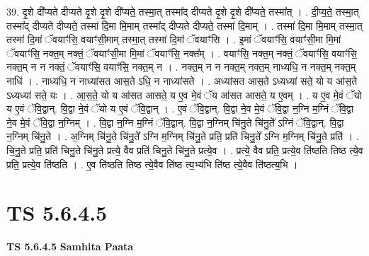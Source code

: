\documentclass[17pt]{extarticle}
\begin{document}
39. दृ॒शे दी᳚प्यते दीप्यते दृ॒शे दृ॒शे दी᳚प्यते॒ तस्मा॒त् तस्मा᳚द् दीप्यते दृ॒शे दृ॒शे दी᳚प्यते॒ तस्मा᳚त् । . दी॒प्य॒ते॒ तस्मा॒त् तस्मा᳚द् दीप्यते दीप्यते॒ तस्मा॑ दि॒मा मि॒माम् तस्मा᳚द् दीप्यते दीप्यते॒ तस्मा॑ दि॒माम् । . तस्मा॑ दि॒मा मि॒माम् तस्मा॒त् तस्मा॑ दि॒मां ॅवयाꣳ॑सि॒ वयाꣳ॑सी॒माम् तस्मा॒त् तस्मा॑ दि॒मां ॅवयाꣳ॑सि । . इ॒मां ॅवयाꣳ॑सि॒ वयाꣳ॑सी॒मा मि॒मां ॅवयाꣳ॑सि॒ नक्त॒म् नक्तं॒ ॅवयाꣳ॑सी॒मा मि॒मां ॅवयाꣳ॑सि॒ नक्त᳚म् । . वयाꣳ॑सि॒ नक्त॒म् नक्तं॒ ॅवयाꣳ॑सि॒ वयाꣳ॑सि॒ नक्त॒म् न न नक्तं॒ ॅवयाꣳ॑सि॒ वयाꣳ॑सि॒ नक्त॒म् न । . नक्त॒म् न न नक्त॒म् नक्त॒म् नाध्यधि॒ न नक्त॒म् नक्त॒म् नाधि॑ । . नाध्यधि॒ न नाध्या॑सत आस॒ते ऽधि॒ न नाध्या॑सते । . अध्या॑सत आस॒ते ऽध्यध्या॑ सते॒ यो य आ॑स॒ते ऽध्यध्या॑ सते॒ यः । . आ॒स॒ते॒ यो य आ॑सत आसते॒ य ए॒व मे॒वं ॅय आ॑सत आसते॒ य ए॒वम् । . य ए॒व मे॒वं ॅयो य ए॒वं ॅवि॒द्वान्. वि॒द्वा ने॒वं ॅयो य ए॒वं ॅवि॒द्वान् । . ए॒वं ॅवि॒द्वान्. वि॒द्वा ने॒व मे॒वं ॅवि॒द्वा न॒ग्नि म॒ग्निं ॅवि॒द्वा ने॒व मे॒वं ॅवि॒द्वा न॒ग्निम् । . वि॒द्वा न॒ग्नि म॒ग्निं ॅवि॒द्वान्. वि॒द्वा न॒ग्निम् चि॑नु॒ते चि॑नु॒ते᳚ ऽग्निं ॅवि॒द्वान्. वि॒द्वा न॒ग्निम् चि॑नु॒ते । . अ॒ग्निम् चि॑नु॒ते चि॑नु॒ते᳚ ऽग्नि म॒ग्निम् चि॑नु॒ते प्रति॒ प्रति॑ चिनु॒ते᳚ ऽग्नि म॒ग्निम् चि॑नु॒ते प्रति॑ । . चि॒नु॒ते प्रति॒ प्रति॑ चिनु॒ते चि॑नु॒ते प्रत्ये॒ वैव प्रति॑ चिनु॒ते चि॑नु॒ते प्रत्ये॒व । . प्रत्ये॒ वैव प्रति॒ प्रत्ये॒व ति॑ष्ठति तिष्ठ त्ये॒व प्रति॒ प्रत्ये॒व ति॑ष्ठति । . ए॒व ति॑ष्ठति तिष्ठ त्ये॒वैव ति॑ष्ठ त्य॒भ्य॑भि ति॑ष्ठ त्ये॒वैव ति॑ष्ठत्य॒भि । \newline
\pagebreak
{}

\section{ TS 5.6.4.5 }

\textbf{TS 5.6.4.5 } \newline
\textbf{Samhita Paata} \newline
\end{document}
